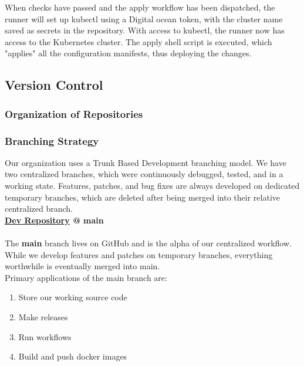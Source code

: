 When checks have passed and the apply workflow has been dispatched, the runner will set up kubectl using a Digital ocean token, with the cluster name saved as secrets in the repository. With access to kubectl, the runner now has access to the Kubernetes cluster. The apply shell script is executed, which "applies" all the configuration manifests, thus deploying the changes.


\subsection{Version Control}
\label{subsec:vs}
\subsubsection{Organization of Repositories}
\subsubsection{Branching Strategy}


Our organization uses a Trunk Based Development branching model. We have two centralized branches, which were continuously debugged, tested, and in a working state. Features, patches, and bug fixes are always developed on dedicated temporary branches, which are deleted after being merged into their relative centralized branch. \\

\textbf{\hyperref[app:devRepo]{Dev Repository} @ main} \\\\
The \textbf{main} branch lives on GitHub and is the alpha of our centralized workflow. While we develop features and patches on temporary branches, everything worthwhile is eventually merged into main. \\

Primary applications of the main branch are:
\begin{enumerate}
    \item Store our working source code
    \item Make releases
    \item Run workflows
    \item Build and push docker images\\
\end{enumerate}

